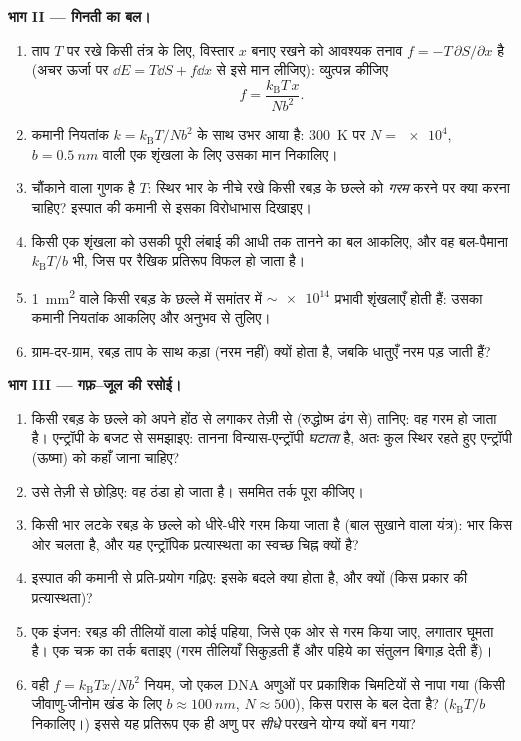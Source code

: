 \begin{problem}
\medskip\noindent\textbf{भाग II --- गिनती का बल।}
\begin{enumerate}[resume]
  \item ताप $T$ पर रखे किसी तंत्र के लिए, विस्तार $x$ बनाए रखने
        को आवश्यक तनाव $f = -T\,\partial S/\partial x$ है
        (अचर ऊर्जा पर $\dd E = T\dd S + f\dd x$ से इसे मान
        लीजिए): व्युत्पन्न कीजिए
        \[
        f = \frac{k_{\text{B}}T\,x}{Nb^2} .
        \]
  \item {} कमानी नियतांक $k =
        k_{\text{B}}T/Nb^2$ के साथ उभर आया है: \qty{300}{K} पर $N =
        \num{e4}$, $b = \qty{0.5}{nm}$ वाली एक शृंखला के लिए उसका मान निकालिए।
  \item चौंकाने वाला गुणक है $T$: स्थिर भार के नीचे रखे किसी रबड़
        के छल्ले को \emph{गरम} करने पर क्या करना चाहिए? इस्पात की
        कमानी से इसका विरोधाभास दिखाइए।
  \item किसी एक शृंखला को उसकी पूरी लंबाई की आधी तक तानने का बल
        आकलिए, और वह बल-पैमाना $k_{\text{B}}T/b$ भी, जिस पर रैखिक
        प्रतिरूप विफल हो जाता है।
  \item \qty{1}{mm^2}  वाले किसी रबड़ के छल्ले में
        समांतर में $\sim\num{e14}$ प्रभावी शृंखलाएँ होती हैं: उसका
        कमानी नियतांक आकलिए और अनुभव से तुलिए।
  \item ग्राम-दर-ग्राम, रबड़ ताप के साथ कड़ा (नरम नहीं) क्यों होता
        है, जबकि धातुएँ नरम पड़ जाती हैं?
\end{enumerate}

\medskip\noindent\textbf{भाग III --- गफ़--जूल की रसोई।}
\begin{enumerate}[resume]
  \item किसी रबड़ के छल्ले को अपने होंठ से लगाकर तेज़ी से (रुद्धोष्म
        ढंग से) तानिए: वह गरम हो जाता है। एन्ट्रॉपी के बजट से
        समझाइए: तानना विन्यास-एन्ट्रॉपी \emph{घटाता} है, अतः कुल
        स्थिर रहते हुए एन्ट्रॉपी (ऊष्मा) को कहाँ जाना चाहिए?
  \item उसे तेज़ी से छोड़िए: वह ठंडा हो जाता है। सममित तर्क पूरा
        कीजिए।
  \item किसी भार लटके रबड़ के छल्ले को धीरे-धीरे गरम किया जाता है
        (बाल सुखाने वाला यंत्र): भार किस ओर चलता है, और यह
        एन्ट्रॉपिक प्रत्यास्थता का स्वच्छ चिह्न क्यों है?
  \item इस्पात की कमानी से प्रति-प्रयोग गढ़िए: इसके बदले क्या होता
        है, और क्यों (किस प्रकार की प्रत्यास्थता)?
  \item एक इंजन: रबड़ की तीलियों वाला कोई पहिया, जिसे एक ओर से गरम
        किया जाए, लगातार घूमता है। एक चक्र का तर्क बताइए (गरम
        तीलियाँ सिकुड़ती हैं और पहिये का संतुलन बिगाड़ देती हैं)।
  \item वही $f = k_{\text{B}}Tx/Nb^2$ नियम, जो एकल DNA अणुओं पर
        प्रकाशिक चिमटियों से नापा गया (किसी जीवाणु-जीनोम खंड के लिए
        $b \approx
        \qty{100}{nm}$, $N \approx 500$), किस परास के बल देता है?
        ($k_{\text{B}}T/b$ निकालिए।) इससे यह प्रतिरूप एक ही अणु पर
        \emph{सीधे} परखने योग्य क्यों बन गया?
\end{enumerate}


\end{problem}

